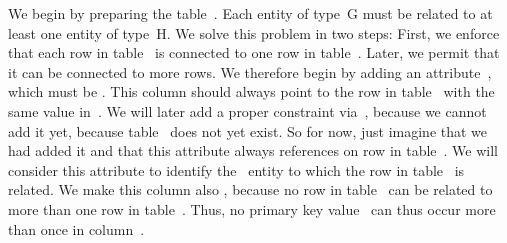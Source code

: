 We begin by preparing the table~.
Each entity of type~G must be related to at least one entity of type~H.
We solve this problem in two steps:
First, we enforce that each row in table~ is connected to one row in table~.
Later, we permit that it can be connected to more rows.
We therefore begin by adding an attribute~, which must be .
This column should always point to the row in table~ with the same value in~.
We will later add a proper  constraint via~, because we cannot add it yet, because table~ does not yet exist.
So for now, just imagine that we had added it and that this attribute always references on row in table~.
We will consider this attribute to identify the ~entity to which the row in table~ is related.
We make this column also , because no row in table~ can be related to more than one row in table~.
Thus, no primary key value~ can thus occur more than once in column~.

